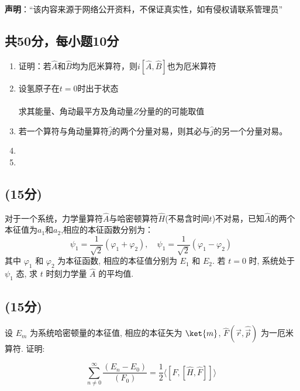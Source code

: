
\textbf{声明}：“该内容来源于网络公开资料，不保证真实性，如有侵权请联系管理员”

\subsection{共50分，每小题10分}
\begin{enumerate}
\item 证明：若$\hat{A}$和$\hat{B}$均为厄米算符，则$i[\hat{A},\hat{B}]$也为厄米算符
\item 设氢原子在$t=0$时出于状态\\\\
求其能量、角动最平方及角动量$Z$分量的的可能取值
\item 若一个算符与角动量算符$\hat{j}$的两个分量对易，则其必与$\hat{j}$的另一个分量对易。
\item 
\item 
\end{enumerate}
\subsection{(15分)}
对于一个系统，力学量算符$\hat{A}$与哈密顿算符$\hat{H}$(不易含时间$t$)不对易，已知$\hat{A}$的两个本征值为$a_1$和$a_2$,相应的本征函数分别为：
$$\psi_1 = \frac{1}{\sqrt{2}} (\varphi_1 + \varphi_2), \quad \psi_1 = \frac{1}{\sqrt{2}} (\varphi_1 - \varphi_2)~$$
其中 $\varphi_1$ 和 $\varphi_2$ 为本征函数, 相应的本征值分别为 $E_1$ 和 $E_2$. 若 $t = 0$ 时, 系统处于 $\psi_1$ 态, 求 $t$ 时刻力学量 $\hat{A}$ 的平均值.
\subsection{(15分)}
设 $E_m$ 为系统哈密顿量的本征值, 相应的本征矢为 $\ket{m}$, $\hat{F}(\vec{r}, \hat{\vec{p}})$ 为一厄米算符. 证明:

$$\sum^\infty_{n\neq0} \frac{(E_n - E_0)}{(F_0)} = \frac{1}{2} \langle [\hat{F}, [\hat{H}, \hat{F}]] \rangle~$$